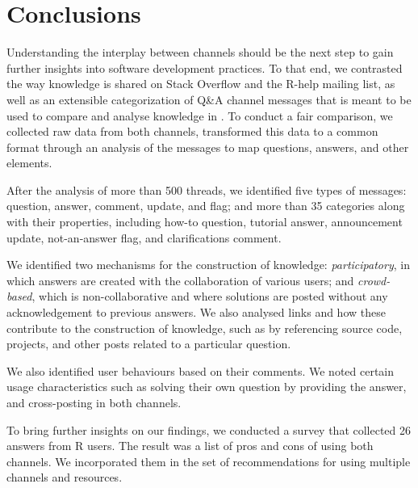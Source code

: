 \section{Conclusions}
\label{cha:conclusion}


    Understanding the interplay between channels should be the next step to gain further insights into software development practices.
    To that end, we contrasted the way knowledge is shared on Stack Overflow and the R-help mailing list, as well as an extensible categorization of Q\&A channel messages that is meant to be used to compare and analyse knowledge in \channels.
    To conduct a fair comparison, we collected raw data from both channels, transformed this data to a common format through an analysis of the messages to map questions, answers, and other elements.

    After the analysis of more than 500 threads, we identified five types of messages: question, answer, comment, update, and flag; and more than 35 categories along with their properties, including how-to question, tutorial answer, announcement update, not-an-answer flag, and clarifications comment.

    We identified two mechanisms for the construction of knowledge: \emph{participatory}, in which answers are created with the collaboration of various users; and \emph{crowd-based}, which is non-collaborative and where solutions are posted without any acknowledgement to previous answers.
    We also analysed links and how these contribute to the construction of knowledge, such as by referencing source code, projects, and other posts related to a particular question.

    We also identified user behaviours based on their comments.
    We noted certain usage characteristics such as solving their own question by providing the answer, and cross-posting in both channels.

    To bring further insights on our findings, we conducted a survey that collected 26 answers from R users.
    The result was a list of pros and cons of using both channels. We incorporated them in the set of recommendations for using multiple channels and resources.

